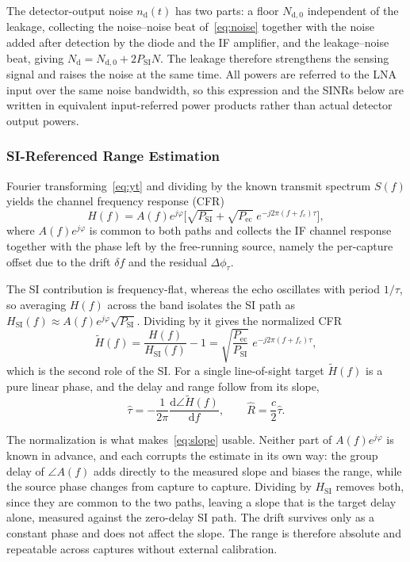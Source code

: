 \documentclass[10pt,journal,comsoc]{IEEEtran}
\begin{document}
The detector-output noise $n_{\mathrm{d}}(t)$ has two parts: a floor
$N_{\mathrm{d},0}$ independent of the leakage, collecting the
noise--noise beat of~\eqref{eq:noise} together with the noise added
after detection by the diode and the IF amplifier, and the
leakage--noise beat, giving
$N_{\mathrm{d}}=N_{\mathrm{d},0}+2P_{\mathrm{SI}}N$. The leakage
therefore strengthens the sensing signal and raises the noise at the
same time. All powers are referred to the LNA input over the same noise
bandwidth, so this expression and the SINRs below are written in
equivalent input-referred power products rather than actual detector
output powers.

\subsubsection{SI-Referenced Range Estimation}
Fourier transforming~\eqref{eq:yt} and dividing by the known transmit
spectrum $S(f)$ yields the channel frequency response (CFR)
\begin{equation}
H(f)=A(f)e^{j\varphi}\Big[\sqrt{P_{\mathrm{SI}}}
+\sqrt{P_{\mathrm{ec}}}\;e^{-j2\pi(f+f_c)\tau}\Big],
\label{eq:cfr}
\end{equation}
where $A(f)e^{j\varphi}$ is common to both paths and collects the IF
channel response together with the phase left by the free-running
source, namely the per-capture offset due to the drift $\delta\!f$ and
the residual $\Delta\phi_\tau$.

The SI contribution is frequency-flat, whereas the echo oscillates with
period $1/\tau$, so averaging $H(f)$ across the band isolates the SI
path as $H_{\mathrm{SI}}(f)\approx
A(f)e^{j\varphi}\sqrt{P_{\mathrm{SI}}}$. Dividing by it gives the
normalized CFR
\begin{equation}
\tilde H(f)=\frac{H(f)}{H_{\mathrm{SI}}(f)}-1
=\sqrt{\frac{P_{\mathrm{ec}}}{P_{\mathrm{SI}}}}\;
e^{-j2\pi(f+f_c)\tau},
\label{eq:sinorm}
\end{equation}
which is the second role of the SI. For a single line-of-sight target
$\tilde H(f)$ is a pure linear phase, and the delay and range follow
from its slope,
\begin{equation}
\hat\tau=-\frac{1}{2\pi}\frac{\mathrm{d}\angle\tilde H(f)}{\mathrm{d}f},
\qquad \hat R=\frac{c}{2}\hat\tau.
\label{eq:slope}
\end{equation}

The normalization is what makes~\eqref{eq:slope} usable. Neither part
of $A(f)e^{j\varphi}$ is known in advance, and each corrupts the
estimate in its own way: the group delay of $\angle A(f)$ adds directly
to the measured slope and biases the range, while the source phase
changes from capture to capture. Dividing by $H_{\mathrm{SI}}$ removes
both, since they are common to the two paths, leaving a slope that is
the target delay alone, measured against the zero-delay SI path. The
drift survives only as a constant phase and does not affect the slope.
The range is therefore absolute and repeatable across captures without
external calibration.
\end{document}

